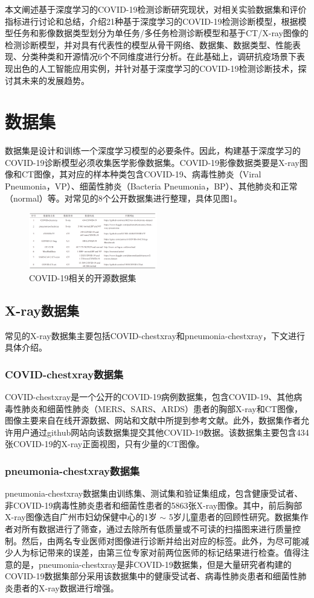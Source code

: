 \documentclass[journal,twoside,web]{ieeecolor}
\begin{document}
本文阐述基于深度学习的COVID-19检测诊断研究现状，对相关实验数据集和评价指标进行讨论和总结，介绍21种基于深度学习的COVID-19检测诊断模型，根据模型任务和影像数据类型划分为单任务/多任务检测诊断模型和基于CT/X-ray图像的检测诊断模型，并对具有代表性的模型从骨干网络、数据集、数据类型、性能表现、分类种类和开源情况6个不同维度进行分析。在此基础上，调研抗疫场景下表现出色的人工智能应用实例，并针对基于深度学习的COVID-19检测诊断技术，探讨其未来的发展趋势。


\section{数据集}
数据集是设计和训练一个深度学习模型的必要条件。因此，构建基于深度学习的COVID-19诊断模型必须收集医学影像数据集。COVID-19影像数据类要是X-ray图像和CT图像，其对应的样本种类包含COVID-19、病毒性肺炎（Viral Pneumonia，VP）、细菌性肺炎（Bacteria Pneumonia，BP）、其他肺炎和正常（normal）等。对常见的8个公开数据集进行整理，具体见图1。
\begin{figure}[h]
\centering
\includegraphics[width=0.5\textwidth]{img/fig0.png}
\caption{COVID-19相关的开源数据集}
\label{fig:COVID-19_dataset}
\end{figure}
\subsection{X-ray数据集}
常见的X-ray数据集主要包括COVID-chestxray和pneumonia-chestxray，下文进行具体介绍。
\subsubsection{COVID-chestxray数据集}
COVID-chestxray是一个公开的COVID-19病例数据集，包含COVID-19、其他病毒性肺炎和细菌性肺炎（MERS、SARS、ARDS）患者的胸部X-ray和CT图像，图像主要来自在线开源数据、网站和文献中所提到参考文献。此外，数据集作者允许用户通过github网站向该数据集提交其他COVID-19数据。该数据集主要包含434张COVID-19的X-ray正面视图，只有少量的CT图像。
\subsubsection{pneumonia-chestxray数据集}
pneumonia-chestxray数据集由训练集、测试集和验证集组成，包含健康受试者、非COVID-19病毒性肺炎患者和细菌性患者的5863张X-ray图像。其中，前后胸部X-ray图像选自广州市妇幼保健中心的1岁 $ \sim $ 5岁儿童患者的回顾性研究。数据集作者对所有数据进行了筛查，通过去除所有低质量或不可读的扫描图来进行质量控制。然后，由两名专业医师对图像进行诊断并给出对应的标签。此外，为尽可能减少人为标记带来的误差，由第三位专家对前两位医师的标记结果进行检查。值得注意的是，pneumonia-chestxray是非COVID-19数据集，但是大量研究者构建的COVID-19数据集部分采用该数据集中的健康受试者、病毒性肺炎患者和细菌性肺炎患者的X-ray数据进行增强。
\end{document}
